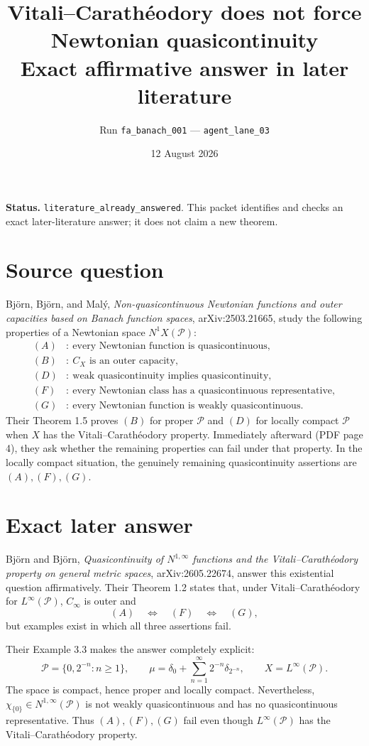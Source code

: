 \documentclass[11pt]{article}
\title{Vitali--Carath\'eodory does not force Newtonian quasicontinuity\\
\large Exact affirmative answer in later literature}
\author{Run \texttt{fa\_banach\_001} --- \texttt{agent\_lane\_03}}
\date{12 August 2026}
\newcommand{\Pcal}{\mathcal P}
\newcommand{\Ninf}{N^{1,\infty}}
\newcommand{\Cinf}{C_\infty}
\begin{document}
\maketitle

\textbf{Status.} \texttt{literature\_already\_answered}.  This packet
identifies and checks an exact later-literature answer; it does not claim a
new theorem.

\section*{Source question}

Bj\"orn, Bj\"orn, and Mal\'y, \emph{Non-quasicontinuous Newtonian functions
and outer capacities based on Banach function spaces}, arXiv:2503.21665,
study the following properties of a Newtonian space $N^1X(\Pcal)$:
\begin{align*}
 (A)&:\ \text{every Newtonian function is quasicontinuous},\\
 (B)&:\ C_X\text{ is an outer capacity},\\
 (D)&:\ \text{weak quasicontinuity implies quasicontinuity},\\
 (F)&:\ \text{every Newtonian class has a quasicontinuous representative},\\
 (G)&:\ \text{every Newtonian function is weakly quasicontinuous}.
\end{align*}
Their Theorem 1.5 proves $(B)$ for proper $\Pcal$ and $(D)$ for locally
compact $\Pcal$ when $X$ has the Vitali--Carath\'eodory property.  Immediately
afterward (PDF page 4), they ask whether the remaining properties can fail
under that property.  In the locally compact situation, the genuinely
remaining quasicontinuity assertions are $(A),(F),(G)$.

\section*{Exact later answer}

Bj\"orn and Bj\"orn, \emph{Quasicontinuity of $N^{1,\infty}$ functions and
the Vitali--Carath\'eodory property on general metric spaces},
arXiv:2605.22674, answer this existential question affirmatively.  Their
Theorem 1.2 states that, under Vitali--Carath\'eodory for $L^\infty(\Pcal)$,
$\Cinf$ is outer and
\[
 (A)\quad\Longleftrightarrow\quad(F)\quad\Longleftrightarrow\quad(G),
\]
but examples exist in which all three assertions fail.

Their Example 3.3 makes the answer completely explicit:
\[
 \Pcal=\{0,2^{-n}:n\ge1\},\qquad
 \mu=\delta_0+\sum_{n=1}^{\infty}2^{-n}\delta_{2^{-n}},
 \qquad X=L^\infty(\Pcal).
\]
The space is compact, hence proper and locally compact.  Nevertheless,
$\chi_{\{0\}}\in\Ninf(\Pcal)$ is not weakly quasicontinuous and has no
quasicontinuous representative.  Thus $(A),(F),(G)$ fail even though
$L^\infty(\Pcal)$ has the Vitali--Carath\'eodory property.
\end{document}
